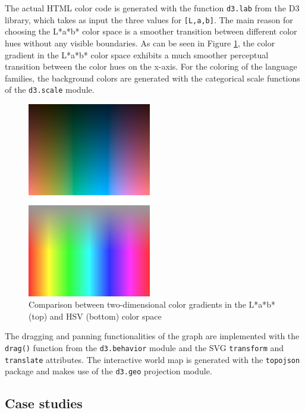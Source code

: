 The actual HTML color code is generated with the function \texttt{d3.lab} from the D3 library, which takes as input the three values for \texttt{[L,a,b]}. The main reason for choosing the L*a*b* color space is a smoother transition between different color hues without any visible boundaries. As can be seen in Figure \ref{lab vs hsv}, the color gradient in the L*a*b* color space exhibits a much smoother perceptual transition between the color hues on the x-axis. 
For the coloring of the language families, the background colors are generated with the categorical scale functions of the \texttt{d3.scale} module. 

\begin{figure}[h]
    \centering
   \includegraphics[width=0.48\textwidth]{img/Lab_HSV.png}
    \caption{Comparison between two-dimensional color gradients in the L*a*b* (top) and HSV (bottom) color space}
    \label{lab vs hsv}
\end{figure}


The  dragging and panning functionalities of the graph are implemented with the \texttt{drag()} function from the \texttt{d3.behavior} module and the SVG \texttt{transform} and \texttt{translate} attributes. The interactive world map is generated with the \texttt{topojson} package and makes use of the \texttt{d3.geo} projection module.

\subsection{Case studies} \label{case study}

